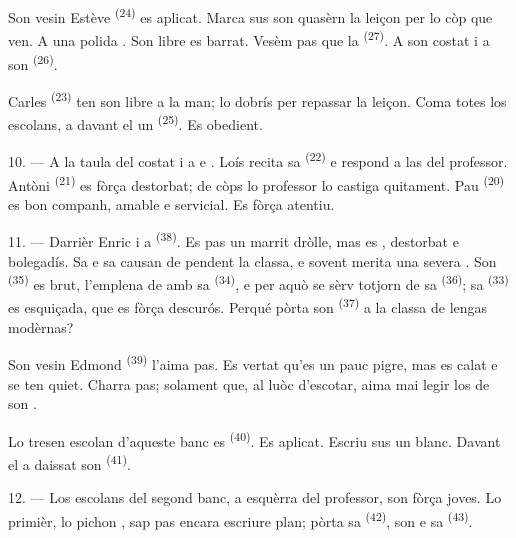 Son vesin Estève \textsuperscript{(24)} es aplicat. Marca sus son quasèrn la
leiçon per lo còp que ven. A una polida . Son libre es barrat.
Vesèm pas que la  \textsuperscript{(27)}. A son costat i a son
 \textsuperscript{(26)}.

Carles \textsuperscript{(23)} ten son libre a la man; lo dobrís per repassar la
leiçon. Coma totes los escolans, a davant el un 
\textsuperscript{(25)}. Es obedient.

10. --- A la taula del costat i a  e . Loís
recita sa  \textsuperscript{(22)} e respond a las
 del professor. Antòni \textsuperscript{(21)} es fòrça
destorbat; de còps lo professor lo castiga quitament. Pau
\textsuperscript{(20)} es bon companh, amable e servicial. Es fòrça atentiu.

\VUsaut{4.2mm}
\VUsaut{3.2mm}

11. --- Darrièr Enric i a  \textsuperscript{(38)}. Es pas un marrit
dròlle, mas es , destorbat e bolegadís. Sa
 e sa  causan de 
pendent la classa, e sovent merita una severa . Son
 \textsuperscript{(35)} es brut, l'emplena de
 amb sa  \textsuperscript{(34)}, e per aquò
se sèrv totjorn de sa  \textsuperscript{(36)}; sa
 \textsuperscript{(33)} es esquiçada, que es fòrça descurós.
Perqué pòrta son  \textsuperscript{(37)} a la classa de lengas
modèrnas?

Son vesin Edmond \textsuperscript{(39)} l'aima pas. Es vertat qu'es un pauc
pigre, mas es calat e se ten quiet. Charra pas; solament que, al luòc
d'escotar, aima mai legir los  de son .

Lo tresen escolan d'aqueste banc es  \textsuperscript{(40)}. Es
aplicat. Escriu sus un  blanc. Davant el a daissat son
 \textsuperscript{(41)}.

12. --- Los escolans del segond banc, a esquèrra del professor, son fòrça joves.
Lo primièr, lo pichon , sap pas encara escriure plan; pòrta sa
 \textsuperscript{(42)}, son  e sa
 \textsuperscript{(43)}.

